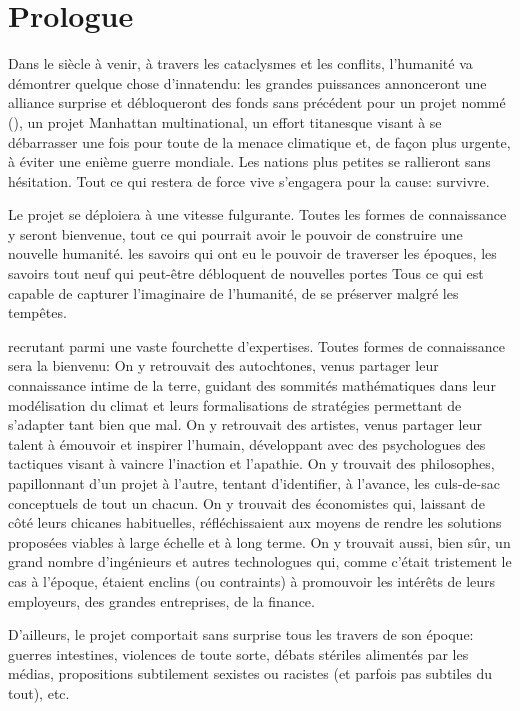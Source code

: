 \chapter*{Prologue}

Dans le siècle à venir, à travers les cataclysmes et les conflits, l'humanité
va démontrer quelque chose d'innatendu: les grandes puissances annonceront une
alliance surprise et débloqueront des fonds sans précédent pour un projet nommé
\textit{\nomProjet{}} (\nomProjetEn{}), un projet Manhattan multinational, un
effort titanesque visant à se débarrasser une fois pour toute de la menace
climatique et, de façon plus urgente, à éviter une enième guerre mondiale.  Les
nations plus petites se rallieront sans hésitation.  Tout ce qui restera de
force vive s'engagera pour la cause: survivre.

Le projet \nomProjet{} se déploiera à une vitesse fulgurante.  Toutes les
formes de connaissance y seront bienvenue, tout ce qui pourrait avoir le
pouvoir de construire une nouvelle humanité.  les savoirs qui ont eu le pouvoir
de traverser les époques, les savoirs tout neuf qui peut-être débloquent de
nouvelles portes Tous ce qui est capable de capturer l'imaginaire de
l'humanité, de se préserver malgré les tempêtes.



recrutant parmi une vaste fourchette d'expertises.  
Toutes formes de connaissance sera la bienvenu:
On y
retrouvait des autochtones, venus partager leur connaissance intime de la
terre, guidant des sommités mathé\-matiques dans leur modélisation du climat et
leurs formalisations de stra\-tégies permettant de s'adapter tant
bien que mal.  On y retrouvait des artistes, venus partager leur talent à
émouvoir et inspirer l'humain, développant avec des psychologues des
tactiques visant à vaincre l'in\-act\-ion et l'apathie.  On y trouvait des
philosophes, papillonnant d'un projet à l'autre, tentant d'identifier, à
l'avance, les culs-de-sac con\-cept\-uels de tout un chacun.  On y trouvait
des économistes qui, laissant de côté leurs chicanes habituelles,
réfléchissaient aux moyens de rendre les solutions proposées viables à
large échelle et à long terme.  On y trouvait aussi, bien sûr, un grand
nombre d'ingénieurs et autres technologues qui, comme c'était trist\-ement
le cas à l'époque, étaient enclins (ou contraints) à promouvoir les
intérêts de leurs employeurs, des grandes entreprises, de la finance.

D'ailleurs, le projet \nomProjet{} comportait sans surprise tous les
travers de son époque: guerres intestines, violences de toute sorte, débats
stériles alimentés par les médias, propositions
subti\-le\-ment sexistes ou racistes (et parfois pas subtiles du tout), etc.

